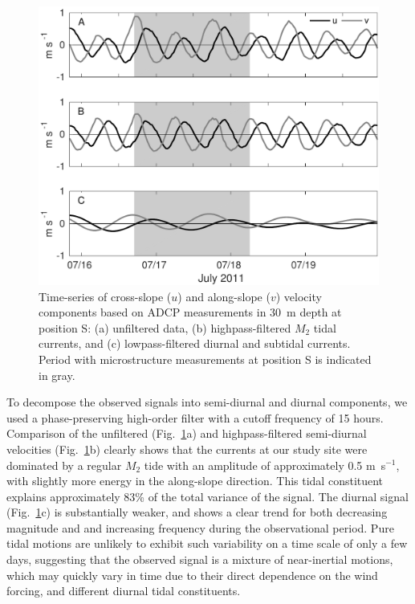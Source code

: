 \begin{figure}
  \noindent\includegraphics[width=30pc]{timeseries.pdf}
  \caption{Time-series of cross-slope ($u$) and along-slope ($v$)
    velocity components based on ADCP measurements in 30~m depth at
    position S: (a) unfiltered data, (b) highpass-filtered $M_2$ tidal
    currents, and (c) lowpass-filtered diurnal
    and subtidal currents. Period with microstructure measurements at
    position S is indicated in gray.}
  \label{tides}
\end{figure}

To decompose the observed signals into semi-diurnal and diurnal
components, we used a phase-preserving high-order filter with a cutoff
frequency of 15 hours. Comparison of the unfiltered
(Fig.\ \ref{tides}a) and highpass-filtered semi-diurnal velocities
(Fig.\ \ref{tides}b) clearly shows that the currents at our study site
were dominated by a regular $M_2$ tide with an amplitude of
approximately 0.5 m~s$^{-1}$, with slightly more energy in the
along-slope direction. This tidal constituent explains approximately
83\% of the total variance of the signal. The diurnal signal
(Fig.\ \ref{tides}c) is substantially weaker, and shows a clear trend
for both decreasing magnitude and and increasing frequency during the
observational period. Pure tidal motions are unlikely to exhibit such
variability on a time scale of only a few days, suggesting that the
observed signal is a mixture of near-inertial motions, which may
quickly vary in time due to their direct dependence on the wind
forcing, and different diurnal tidal constituents.

